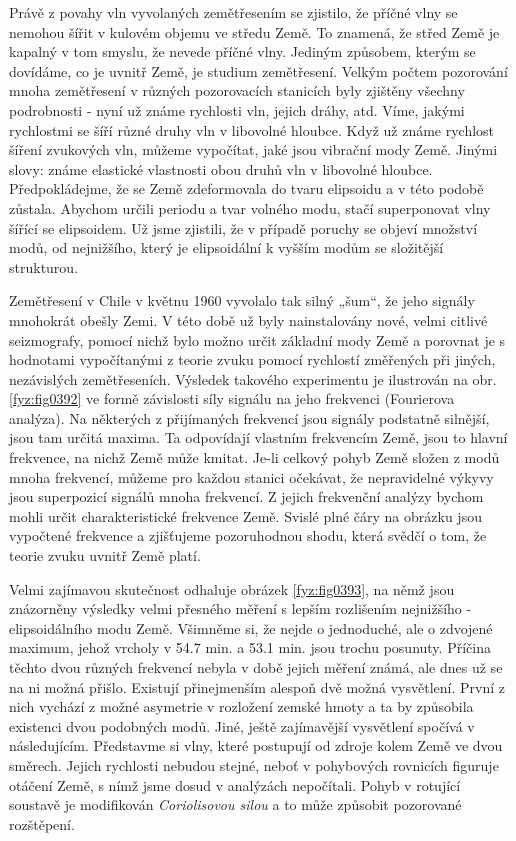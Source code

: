   Právě z povahy vln vyvolaných zemětřesením se zjistilo, že příčné vlny se nemohou šířit v kulovém 
  objemu ve středu Země. To znamená, že střed Země je kapalný v tom smyslu, že nevede příčné vlny. 
  Jediným způsobem, kterým se dovídáme, co je uvnitř Země, je studium zemětřesení. Velkým počtem 
  pozorování mnoha zemětřesení v různých pozorovacích stanicích byly zjištěny všechny podrobnosti - 
  nyní už známe rychlosti vln, jejich dráhy, atd. Víme, jakými rychlostmi se šíří různé druhy vln v 
  libovolné hloubce. Když už známe rychlost šíření zvukových vln, můžeme vypočítat, jaké jsou 
  vibrační mody Země. Jinými slovy: známe elastické vlastnosti obou druhů vln v libovolné hloubce. 
  Předpokládejme, že se Země zdeformovala do tvaru elipsoidu a v této podobě zůstala. Abychom 
  určili periodu a tvar volného modu, stačí superponovat vlny šířící se elipsoidem. Už jsme 
  zjistili, že v případě poruchy se objeví množství modů, od nejnižšího, který je elipsoidální k 
  vyšším modům se složitější strukturou.
  
  Zemětřesení v Chile v květnu 1960 vyvolalo tak silný „šum“, že jeho signály mnohokrát obešly 
  Zemi. V této době už byly nainstalovány nové, velmi citlivé seizmografy, pomocí nichž bylo možno 
  určit základní mody Země a porovnat je s hodnotami vypočítanými z teorie zvuku pomocí rychlostí 
  změřených při jiných, nezávislých zemětřeseních. Výsledek takového experimentu je ilustrován na 
  obr. \ref{fyz:fig0392} ve formě závislosti síly signálu na jeho frekvenci (Fourierova analýza). Na 
  některých z přijímaných frekvencí jsou signály podstatně silnější, jsou tam určitá maxima. Ta 
  odpovídají vlastním frekvencím Země, jsou to hlavní frekvence, na nichž Země může kmitat. Je-li 
  celkový pohyb Země složen z modů mnoha frekvencí, můžeme pro každou stanici očekávat, že 
  nepravidelné výkyvy jsou superpozicí signálů mnoha frekvencí. Z jejich frekvenční analýzy bychom 
  mohli určit charakteristické frekvence Země. Svislé plné čáry na obrázku jsou vypočtené frekvence 
  a zjišťujeme pozoruhodnou shodu, která svědčí o tom, že teorie zvuku uvnitř Země platí.
  
  Velmi zajímavou skutečnost odhaluje obrázek \ref{fyz:fig0393}, na němž jsou znázorněny výsledky 
  velmi přesného měření s lepším rozlišením nejnižšího - elipsoidálního modu Země. Všimněme si, že 
  nejde o jednoduché, ale o zdvojené maximum, jehož vrcholy v \num{54.7} min. a \num{53.1} min. 
  jsou trochu posunuty. Příčina těchto dvou různých frekvencí nebyla v době jejich měření známá, 
  ale dnes už se na ni možná přišlo. Existují přinejmenším alespoň dvě možná vysvětlení. První z 
  nich vychází z možné asymetrie v rozložení zemské hmoty a ta by způsobila existenci dvou 
  podobných modů. Jiné, ještě zajímavější vysvětlení spočívá v následujícím. Představme si vlny, 
  které postupují od zdroje kolem Země ve dvou směrech. Jejich rychlosti nebudou stejné, neboť v 
  pohybových rovnicích figuruje otáčení Země, s nímž jsme dosud v analýzách nepočítali. Pohyb v 
  rotující soustavě je modifikován \emph{Coriolisovou silou} a to může způsobit pozorované 
  rozštěpení.

